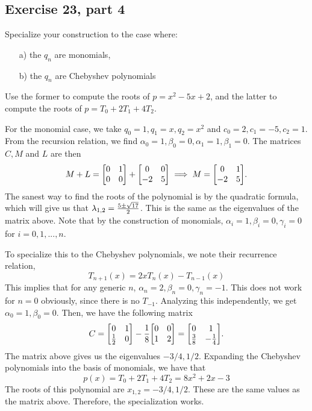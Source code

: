 \subsection{Exercise 23, part 4}
Specialize your construction to the case where: 
\begin{itemize}
    \item[a)] the $q_n$ are monomials,
    \item[b)] the $q_n$ are Chebyshev polynomials
\end{itemize}
Use the former to compute the roots of $p = x^2 - 5x + 2$, and the latter to compute the roots of $p = T_0 + 2T_1 + 4T_2$.
\partbreak
\begin{solution}

    For the monomial case, we take $q_0 = 1, q_1 = x, q_2 = x^2$ and $c_0 = 2, c_1 = -5, c_2 = 1$. From the recursion relation, we find $\alpha_0 = 1, \beta_0 = 0, \alpha_1 = 1, \beta_1 = 0$. The matrices $C, M$ and $L$ are then
    \[M + L = \mqty[0&1\\0&0] + \mqty[0&0\\-2&5] \implies M = \mqty[0&1\\-2&5].\]
    The sanest way to find the roots of the polynomial is by the quadratic formula, which will give us that $\mathrm{\lambda}_{1, 2} = \frac{5 \pm \sqrt{17}}{2}$. This is the same as the eigenvalues of the matrix above. Note that by the construction of monomials, $\alpha_i = 1, \beta_i = 0, \gamma_i = 0$ for $i = 0, 1, ..., n$. \par

    To specialize this to the Chebyshev polynomials, we note their recurrence relation, 
    \[T_{n+1}(x) = 2xT_n(x) - T_{n-1}(x)\]
    This implies that for any generic $n$, $\alpha_n = 2, \beta_n = 0, \gamma_n = -1$. This does not work for $n = 0$ obviously, since there is no $T_{-1}$. Analyzing this independently, we get $\alpha_0 = 1, \beta_0 = 0$. Then, we have the following matrix
    \[C = \mqty[0&1\\\frac{1}{2}&0] - \frac{1}{8}\mqty[0&0\\1&2] = \mqty[0&1\\\frac{3}{8}&-\frac{1}{4}].\]
    The matrix above gives us the eigenvalues $-3/4, 1/2$. Expanding the Chebyshev polynomials into the basis of monomials, we have that 
    \[p(x) = T_0 + 2T_1 + 4T_2 = 8x^2 + 2x - 3\]
    The roots of this polynomial are $x_{1, 2} = -3/4, 1/2$. These are the same values as the matrix above. Therefore, the specialization works. 
\end{solution}

